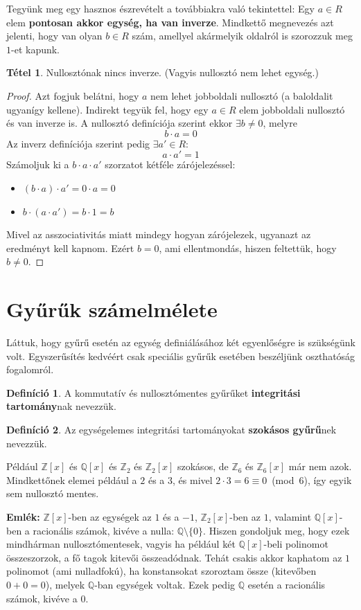 \documentclass[12pt]{book}
\theoremstyle{plain} %
\theoremstyle{definition} %
\newtheorem{defi/}{Definíció}[section]
\newenvironment{defi}
  {\renewcommand{\qedsymbol}{$\clubsuit$}%
   \pushQED{\qed}\begin{defi/}}
  {\popQED\end{defi/}}
\newtheorem{theo/}{Tétel}[section]
\newenvironment{theo}
  {\renewcommand{\qedsymbol}{$\clubsuit$}%
   \pushQED{\qed}\begin{theo/}}
  {\popQED\end{theo/}}
\theoremstyle{remark}
\renewcommand\qedsymbol{$\blacksquare$}
\numberwithin{equation}{section}  %
\begin{document}
	Tegyünk meg egy hasznos észrevételt a továbbiakra való tekintettel: Egy $a\in R$ elem \textbf{pontosan akkor egység, ha van inverze}. Mindkettő megnevezés azt jelenti, hogy van olyan $b\in R$ szám, amellyel akármelyik oldalról is szorozzuk meg $1$-et kapunk.
	\begin{theo}
		Nullosztónak nincs inverze. (Vagyis nullosztó nem lehet egység.)
	\end{theo}
	\begin{proof}
		Azt fogjuk belátni, hogy $a$ nem lehet jobboldali nullosztó (a baloldalit ugyanígy kellene). Indirekt tegyük fel, hogy egy $a\in R$ elem jobboldali nullosztó és van inverze is. A nullosztó definíciója szerint ekkor $\exists b\neq 0$, melyre
		\[ b\cdot a = 0 \]
		Az inverz definíciója szerint pedig $\exists a'\in R\colon$
		\[ a\cdot a' = 1 \]
		Számoljuk ki a $b\cdot a \cdot a'$ szorzatot kétféle zárójelezéssel:
		\begin{itemize}
			\item $(b\cdot a) \cdot a' = 0\cdot a = 0$
			\item $b\cdot (a\cdot a') = b\cdot 1 = b$
		\end{itemize}
		Mivel az asszociativitás miatt mindegy hogyan zárójelezek, ugyanazt az eredményt kell kapnom. Ezért $b=0$, ami ellentmondás, hiszen feltettük, hogy $b\neq 0$.
	\end{proof}
	
	\section{Gyűrűk számelmélete}
	Láttuk, hogy gyűrű esetén az egység definiálásához két egyenlőségre is szükségünk volt. Egyszerűsítés kedvéért csak speciális gyűrűk esetében beszéljünk oszthatóság fogalomról.
	\begin{defi}
		A kommutatív és nullosztómentes gyűrűket \textbf{integritási tartomány}nak nevezzük.
	\end{defi}
	\begin{defi}
		Az egységelemes integritási tartományokat \textbf{szokásos gyűrű}nek nevezzük.
	\end{defi}
	Például $\mathbb{Z}[x]$ és $\mathbb{Q}[x]$ és $\mathbb{Z}_2$ és $\mathbb{Z}_2[x]$ szokásos, de $\mathbb{Z}_6$ és $\mathbb{Z}_6[x]$ már nem azok. Mindkettőnek elemei például a $2$ és a $3$, és mivel $2\cdot 3 = 6 \equiv 0$~(mod~6), így egyik sem nullosztó mentes.
	
	\textbf{Emlék: }$\mathbb{Z}[x]$-ben az egységek az $1$ és a $-1$, $\mathbb{Z}_2[x]$-ben az $1$, valamint $\mathbb{Q}[x]$-ben a racionális számok, kivéve a nulla: $\mathbb{Q}\setminus \{0\}$. Hiszen gondoljuk meg, hogy ezek mindhárman nullosztómentesek, vagyis ha például két $\mathbb{Q}[x]$-beli polinomot összeszorzok, a fő tagok kitevői összeadódnak. Tehát csakis akkor kaphatom az $1$ polinomot (ami nulladfokú), ha konstansokat szoroztam össze (kitevőben $0+0=0$), melyek $\mathbb{Q}$-ban egységek voltak. Ezek pedig $\mathbb{Q}$ esetén a racionális számok, kivéve a $0$.
	
\end{document}
